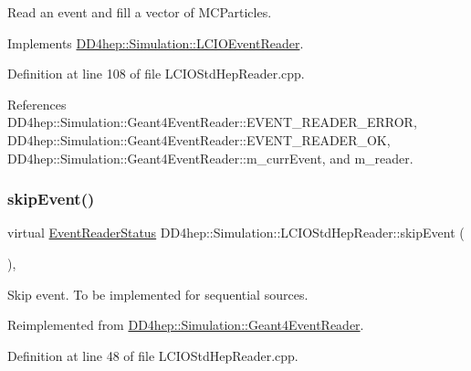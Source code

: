 Read an event and fill a vector of M\+C\+Particles. 



Implements \hyperlink{class_d_d4hep_1_1_simulation_1_1_l_c_i_o_event_reader_a49acaafd98bbd6a954b29cfd9465d017}{D\+D4hep\+::\+Simulation\+::\+L\+C\+I\+O\+Event\+Reader}.



Definition at line 108 of file L\+C\+I\+O\+Std\+Hep\+Reader.\+cpp.



References D\+D4hep\+::\+Simulation\+::\+Geant4\+Event\+Reader\+::\+E\+V\+E\+N\+T\+\_\+\+R\+E\+A\+D\+E\+R\+\_\+\+E\+R\+R\+OR, D\+D4hep\+::\+Simulation\+::\+Geant4\+Event\+Reader\+::\+E\+V\+E\+N\+T\+\_\+\+R\+E\+A\+D\+E\+R\+\_\+\+OK, D\+D4hep\+::\+Simulation\+::\+Geant4\+Event\+Reader\+::m\+\_\+curr\+Event, and m\+\_\+reader.

\hypertarget{class_d_d4hep_1_1_simulation_1_1_l_c_i_o_std_hep_reader_a54ae13b39268486b6edc4a7f9a11ada3}{}\label{class_d_d4hep_1_1_simulation_1_1_l_c_i_o_std_hep_reader_a54ae13b39268486b6edc4a7f9a11ada3} 
\subsubsection{\texorpdfstring{skip\+Event()}{skipEvent()}}
{\footnotesize\ttfamily virtual \hyperlink{class_d_d4hep_1_1_simulation_1_1_geant4_event_reader_ae4f4bc83ffcf5b0c1868ad78859851e7}{Event\+Reader\+Status} D\+D4hep\+::\+Simulation\+::\+L\+C\+I\+O\+Std\+Hep\+Reader\+::skip\+Event (\begin{DoxyParamCaption}{ }\end{DoxyParamCaption})\hspace{0.3cm}{\ttfamily [inline]}, {\ttfamily [virtual]}}



Skip event. To be implemented for sequential sources. 



Reimplemented from \hyperlink{class_d_d4hep_1_1_simulation_1_1_geant4_event_reader_a9381626ad4f4fa20e304414f6654ee03}{D\+D4hep\+::\+Simulation\+::\+Geant4\+Event\+Reader}.



Definition at line 48 of file L\+C\+I\+O\+Std\+Hep\+Reader.\+cpp.



